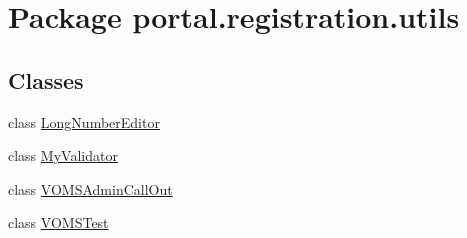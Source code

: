\hypertarget{namespaceportal_1_1registration_1_1utils}{
\section{Package portal.registration.utils}
\label{namespaceportal_1_1registration_1_1utils}
}
\subsection*{Classes}
\begin{DoxyCompactItemize}
\item 
class \hyperlink{classportal_1_1registration_1_1utils_1_1LongNumberEditor}{LongNumberEditor}
\item 
class \hyperlink{classportal_1_1registration_1_1utils_1_1MyValidator}{MyValidator}
\item 
class \hyperlink{classportal_1_1registration_1_1utils_1_1VOMSAdminCallOut}{VOMSAdminCallOut}
\item 
class \hyperlink{classportal_1_1registration_1_1utils_1_1VOMSTest}{VOMSTest}
\end{DoxyCompactItemize}

